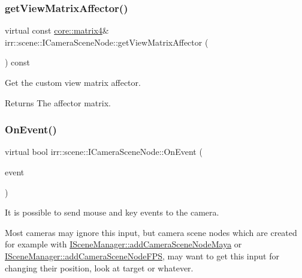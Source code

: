 \subsubsection{\texorpdfstring{get\+View\+Matrix\+Affector()}{getViewMatrixAffector()}\hspace{0.1cm}{\footnotesize\ttfamily [2/2]}}
{\footnotesize\ttfamily virtual const \hyperlink{namespaceirr_1_1core_a4c9d4e29899535971052810954a14431}{core\+::matrix4}\& irr\+::scene\+::\+I\+Camera\+Scene\+Node\+::get\+View\+Matrix\+Affector (\begin{DoxyParamCaption}{ }\end{DoxyParamCaption}) const\hspace{0.3cm}{\ttfamily [pure virtual]}}



Get the custom view matrix affector. 

\begin{DoxyReturn}{Returns}
The affector matrix. 
\end{DoxyReturn}
\mbox{\label{classirr_1_1scene_1_1ICameraSceneNode_af27145518f43a17f803cdea086f68f3c}} 
\subsubsection{\texorpdfstring{On\+Event()}{OnEvent()}\hspace{0.1cm}{\footnotesize\ttfamily [1/2]}}
{\footnotesize\ttfamily virtual bool irr\+::scene\+::\+I\+Camera\+Scene\+Node\+::\+On\+Event (\begin{DoxyParamCaption}\item[{const \hyperlink{structirr_1_1SEvent}{S\+Event} \&}]{event }\end{DoxyParamCaption})\hspace{0.3cm}{\ttfamily [pure virtual]}}



It is possible to send mouse and key events to the camera. 

Most cameras may ignore this input, but camera scene nodes which are created for example with \hyperlink{classirr_1_1scene_1_1ISceneManager_a18e81a59e02231567ac938ea287fe523}{I\+Scene\+Manager\+::add\+Camera\+Scene\+Node\+Maya} or \hyperlink{classirr_1_1scene_1_1ISceneManager_ac312cbc85161678d00192880f2cdddbb}{I\+Scene\+Manager\+::add\+Camera\+Scene\+Node\+F\+PS}, may want to get this input for changing their position, look at target or whatever. 


